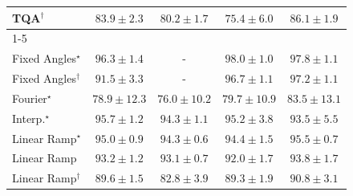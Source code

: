 \begin{tabular}{l|cccc|}
TQA$^\dagger$ & {\cellcolor[HTML]{30954F}} \color[HTML]{F1F1F1} $83.9\pm 2.3$ & {\cellcolor[HTML]{45AD5F}} \color[HTML]{F1F1F1} $80.2\pm 1.7$ & {\cellcolor[HTML]{74C477}} \color[HTML]{000000} $75.4\pm 6.0$ & {\cellcolor[HTML]{258745}} \color[HTML]{F1F1F1} $86.1\pm 1.9$ \\
\cline{1-5}
\multicolumn{5}{c}{\rule{0pt}{8pt}SV} \\
\midrule
Fixed Angles$^\star$ & {\cellcolor[HTML]{034267}} \color[HTML]{F1F1F1} $96.3\pm 1.4$ & {\cellcolor[HTML]{000000}} \color[HTML]{F1F1F1} {\cellcolor{white}} \color{black} - & {\cellcolor[HTML]{023858}} \color[HTML]{F1F1F1} $98.0\pm 1.0$ & {\cellcolor[HTML]{02395A}} \color[HTML]{F1F1F1} $97.8\pm 1.1$ \\
Fixed Angles$^\dagger$ & {\cellcolor[HTML]{045D92}} \color[HTML]{F1F1F1} $91.5\pm 3.3$ & {\cellcolor[HTML]{000000}} \color[HTML]{F1F1F1} {\cellcolor{white}} \color{black} - & {\cellcolor[HTML]{023F64}} \color[HTML]{F1F1F1} $96.7\pm 1.1$ & {\cellcolor[HTML]{023C5F}} \color[HTML]{F1F1F1} $97.2\pm 1.1$ \\
Fourier$^\star$ & {\cellcolor[HTML]{4A98C5}} \color[HTML]{F1F1F1} $78.9\pm 12.3$ & {\cellcolor[HTML]{69A5CC}} \color[HTML]{F1F1F1} $76.0\pm 10.2$ & {\cellcolor[HTML]{4094C3}} \color[HTML]{F1F1F1} $79.7\pm 10.9$ & {\cellcolor[HTML]{1E80B8}} \color[HTML]{F1F1F1} $83.5\pm 13.1$ \\
Interp.$^\star$ & {\cellcolor[HTML]{03456C}} \color[HTML]{F1F1F1} $95.7\pm 1.2$ & {\cellcolor[HTML]{034D79}} \color[HTML]{F1F1F1} $94.3\pm 1.1$ & {\cellcolor[HTML]{034871}} \color[HTML]{F1F1F1} $95.2\pm 3.8$ & {\cellcolor[HTML]{045280}} \color[HTML]{F1F1F1} $93.5\pm 5.5$ \\
Linear Ramp$^\star$ & {\cellcolor[HTML]{034973}} \color[HTML]{F1F1F1} $95.0\pm 0.9$ & {\cellcolor[HTML]{034D79}} \color[HTML]{F1F1F1} $94.3\pm 0.6$ & {\cellcolor[HTML]{034C78}} \color[HTML]{F1F1F1} $94.4\pm 1.5$ & {\cellcolor[HTML]{03466E}} \color[HTML]{F1F1F1} $95.5\pm 0.7$ \\
Linear Ramp & {\cellcolor[HTML]{045483}} \color[HTML]{F1F1F1} $93.2\pm 1.2$ & {\cellcolor[HTML]{045585}} \color[HTML]{F1F1F1} $93.1\pm 0.7$ & {\cellcolor[HTML]{045B8E}} \color[HTML]{F1F1F1} $92.0\pm 1.7$ & {\cellcolor[HTML]{03517E}} \color[HTML]{F1F1F1} $93.8\pm 1.7$ \\
Linear Ramp$^\dagger$ & {\cellcolor[HTML]{04649D}} \color[HTML]{F1F1F1} $89.6\pm 1.5$ & {\cellcolor[HTML]{2484BA}} \color[HTML]{F1F1F1} $82.8\pm 3.9$ & {\cellcolor[HTML]{05659F}} \color[HTML]{F1F1F1} $89.3\pm 1.9$ & {\cellcolor[HTML]{045F95}} \color[HTML]{F1F1F1} $90.8\pm 3.1$ \\

\end{tabular}
